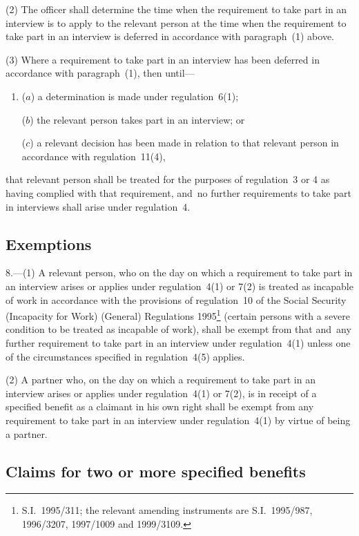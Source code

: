 \documentclass[12pt,a4paper]{article}
\begin{document}
(2) The officer shall determine the time when the requirement to take part in an interview is to apply to the relevant person at the time when the requirement to take part in an interview is deferred in accordance with paragraph~(1) above.

(3) Where a requirement to take part in an interview has been deferred in accordance with paragraph~(1), then until—
\begin{enumerate}\item[]
($a$) a determination is made under regulation~6(1);

($b$) the relevant person takes part in an interview; or

($c$) a relevant decision has been made in relation to that relevant person in accordance with regulation~11(4),
\end{enumerate}
that relevant person shall be treated for the purposes of regulation~3 or 4 as having complied with that requirement, and~no further requirements to take part in interviews shall arise under regulation~4.

\subsection[8. Exemptions]{Exemptions}

8.---(1)  A relevant person, who on the day on which a requirement to take part in an interview arises or applies under regulation~4(1) or 7(2) is treated as incapable of work in accordance with the provisions of regulation~10 of the Social Security (Incapacity for Work) (General) Regulations 1995\footnote{S.I.~1995/311; the relevant amending instruments are S.I.~1995/987, 1996/3207, 1997/1009 and 1999/3109.} (certain persons with a severe condition to be treated as incapable of work), shall be exempt from that and~any further requirement to take part in an interview under regulation~4(1) unless one of the circumstances specified in regulation~4(5) applies.

(2) A partner who, on the day on which a requirement to take part in an interview arises or applies under regulation~4(1) or 7(2), is in receipt of a specified benefit as a claimant in his own right shall be exempt from any requirement to take part in an interview under regulation~4(1) by virtue of being a partner.

\subsection[9. Claims for two or more specified benefits]{Claims for two or more specified benefits}
\end{document}
